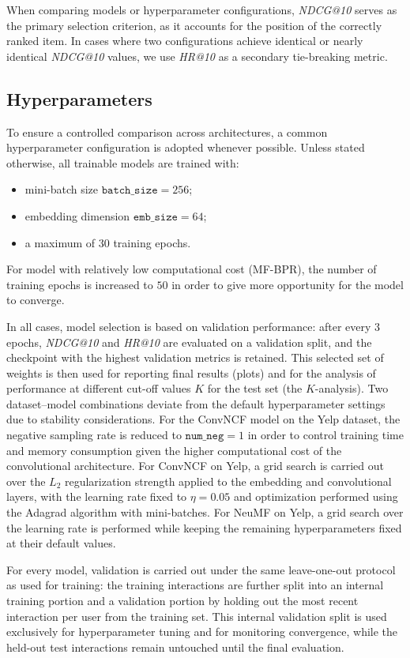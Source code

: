 \documentclass[11pt]{article}
\begin{document}
When comparing models or hyperparameter configurations, \emph{NDCG@10} serves as the primary selection criterion, as it accounts for the position of the correctly ranked item. In cases where two configurations achieve identical or nearly identical \emph{NDCG@10} values, we use \emph{HR@10} as a secondary tie-breaking metric.
\subsection{Hyperparameters}

To ensure a controlled comparison across architectures, a common hyperparameter configuration is adopted whenever possible. Unless stated otherwise, all trainable models are trained with:
\begin{itemize}
    \item mini-batch size $\texttt{batch\_size} = 256$;
    \item embedding dimension $\texttt{emb\_size} = 64$;
    \item a maximum of $30$ training epochs.
\end{itemize}
For model with relatively low computational cost (MF-BPR), the number of training epochs is increased to $50$ in order to give more opportunity for the model to converge. 

In all cases, model selection is based on validation performance: after every 3 epochs, \emph{NDCG@10} and \emph{HR@10} are evaluated on a validation split, and the checkpoint with the highest validation metrics is retained. This selected set of weights is then used for reporting final results (plots) and for the analysis of performance at different cut-off values $K$ for the test set (the $K$-analysis).
Two dataset–model combinations deviate from the default hyperparameter settings due to stability considerations. For the ConvNCF model on the Yelp dataset, the negative sampling rate is reduced to $\texttt{num\_neg} = 1$ in order to control training time and memory consumption given the higher computational cost of the convolutional architecture. For ConvNCF on Yelp, a grid search is carried out over the $L_2$ regularization strength applied to the embedding and convolutional layers, with the learning rate fixed to $\eta = 0.05$ and optimization performed using the Adagrad algorithm with mini-batches. For NeuMF on Yelp, a grid search over the learning rate is performed while keeping the remaining hyperparameters fixed at their default values.

For every model, validation is carried out under the same leave-one-out protocol as used for training: the training interactions are further split into an internal training portion and a validation portion by holding out the most recent interaction per user from the training set. This internal validation split is used exclusively for hyperparameter tuning and for monitoring convergence, while the held-out test interactions remain untouched until the final evaluation.
\end{document}
